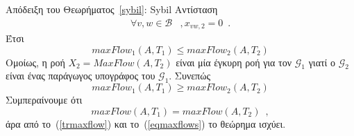 \begin{sepproof}{Απόδειξη του Θεωρήματος~\ref{sybil}: \textlatin{Sybil} Αντίσταση}
\begin{align*}
    \forall v,w \in \mathcal{B}&, x_{vw,2} = 0 \enspace.
  \end{align*}
  Έτσι
  \begin{equation*}
    maxFlow_1\left(A, T_1\right) \leq maxFlow_2\left(A, T_2\right)
  \end{equation*}
  Ομοίως, η ροή $X_2 = MaxFlow(A, T_2)$ είναι μία έγκυρη ροή για τον $\mathcal{G}_1$ γιατί ο $\mathcal{G}_2$ είναι ένας
  παράγωγος υπογράφος του $\mathcal{G}_1$. Συνεπώς
  \begin{equation*}
    maxFlow_1\left(A, T_1\right) \geq maxFlow_2\left(A, T_2\right)
  \end{equation*}
  Συμπεραίνουμε ότι
  \begin{equation}
  \label{eqmaxflows}
    maxFlow\left(A, T_1\right) = maxFlow\left(A, T_2\right) \enspace,
  \end{equation}
  άρα από το~(\ref{trmaxflow}) και το~(\ref{eqmaxflows}) το θεώρημα ισχύει.
\end{sepproof}

